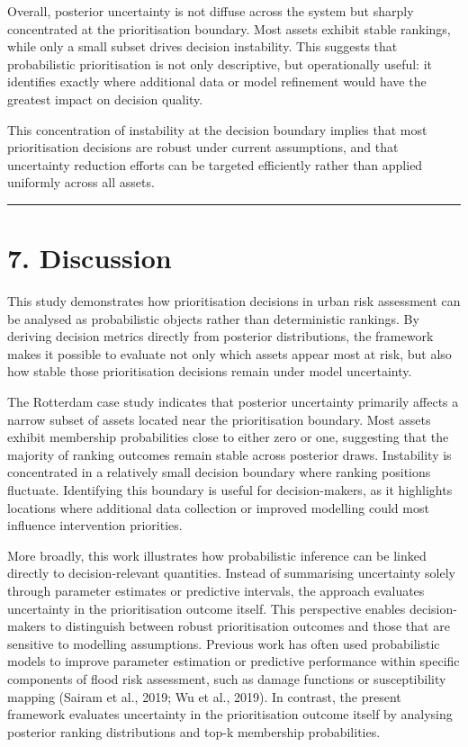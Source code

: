 \documentclass[
]{article}
\begin{document}
Overall, posterior uncertainty is not diffuse across the system but
sharply concentrated at the prioritisation boundary. Most assets exhibit
stable rankings, while only a small subset drives decision instability.
This suggests that probabilistic prioritisation is not only descriptive,
but operationally useful: it identifies exactly where additional data or
model refinement would have the greatest impact on decision quality.

This concentration of instability at the decision boundary implies that
most prioritisation decisions are robust under current assumptions, and
that uncertainty reduction efforts can be targeted efficiently rather
than applied uniformly across all assets.

\begin{center}\rule{0.5\linewidth}{0.5pt}\end{center}

\section{7. Discussion}\label{discussion}

This study demonstrates how prioritisation decisions in urban risk
assessment can be analysed as probabilistic objects rather than
deterministic rankings. By deriving decision metrics directly from
posterior distributions, the framework makes it possible to evaluate not
only which assets appear most at risk, but also how stable those
prioritisation decisions remain under model uncertainty.

The Rotterdam case study indicates that posterior uncertainty primarily
affects a narrow subset of assets located near the prioritisation
boundary. Most assets exhibit membership probabilities close to either
zero or one, suggesting that the majority of ranking outcomes remain
stable across posterior draws. Instability is concentrated in a
relatively small decision boundary where ranking positions fluctuate.
Identifying this boundary is useful for decision-makers, as it
highlights locations where additional data collection or improved
modelling could most influence intervention priorities.

More broadly, this work illustrates how probabilistic inference can be
linked directly to decision-relevant quantities. Instead of summarising
uncertainty solely through parameter estimates or predictive intervals,
the approach evaluates uncertainty in the prioritisation outcome itself.
This perspective enables decision-makers to distinguish between robust
prioritisation outcomes and those that are sensitive to modelling
assumptions. Previous work has often used probabilistic models to
improve parameter estimation or predictive performance within specific
components of flood risk assessment, such as damage functions or
susceptibility mapping (Sairam et al., 2019; Wu et al., 2019). In
contrast, the present framework evaluates uncertainty in the
prioritisation outcome itself by analysing posterior ranking
distributions and top-k membership probabilities.
\end{document}

